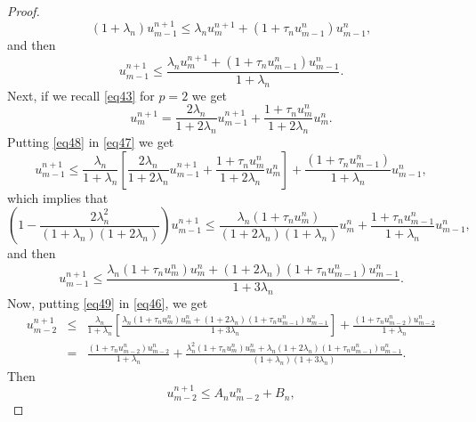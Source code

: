 \documentclass[a4paper,12pt,english,reqno]{smfart}
\begin{document}
\begin{proof}
\begin{equation*}
		(1+\lambda_{n})u_{m-1}^{n+1}\leq \lambda_{n}u_{m}^{n+1}+\left(1+\tau_{n}u_{m-1}^{n}\right)u_{m-1}^{n},
		\end{equation*}
		and then 
		\begin{equation}
		u_{m-1}^{n+1}\leq \frac{\lambda_{n}u_{m}^{n+1}+\left(1+\tau_{n}u_{m-1}^{n}\right)u_{m-1}^{n}}{1+\lambda_{n}}.
		\label{eq47}
		\end{equation}
		Next, if we recall \eqref{eq43} for $p=2$ we get
		\begin{equation}
		u_{m}^{n+1}=\frac{2\lambda_{n}}{1+2\lambda_{n}}u_{m-1}^{n+1}+\frac{1+\tau_{n}u_{m}^{n}}{1+2\lambda_{n}}u_{m}^{n}.
		\label{eq48}
		\end{equation}
		Putting \eqref{eq48} in \eqref{eq47} we get
		\begin{equation*}
		u_{m-1}^{n+1}\leq \frac{\lambda_{n}}{1+\lambda_{n}}\left[\frac{2\lambda_{n}}{1+2\lambda_{n}}u_{m-1}^{n+1}+\frac{1+\tau_{n}u_{m}^{n}}{1+2\lambda_{n}}u_{m}^{n}\right]+\frac{\left(1+\tau_{n}u_{m-1}^{n}\right)}{1+\lambda_{n}}u_{m-1}^{n},
		\end{equation*}
		which implies that
		\begin{equation*}
		\left(1-\frac{2\lambda_{n}^{2}}{(1+\lambda_{n})(1+2\lambda_{n})}\right)u_{m-1}^{n+1}\leq \frac{\lambda_{n}(1+\tau_{n}u_{m}^{n})}{(1+2\lambda_{n})(1+\lambda_{n})}u_{m}^{n}+\frac{1+\tau_{n}u_{m-1}^{n}}{1+\lambda_{n}}u_{m-1}^{n},
		\end{equation*}
		and then
		\begin{equation} 
		u_{m-1}^{n+1}\leq \frac{\lambda_{n}(1+\tau_{n}u_{m}^{n})u_{m}^{n}+(1+2\lambda_{n})(1+\tau_{n}u_{m-1}^{n})u_{m-1}^{n}}{1+3\lambda_{n}}.
		\label{eq49}
		\end{equation}
		Now, putting \eqref{eq49} in \eqref{eq46}, we get
		\begin{eqnarray*} 
			u_{m-2}^{n+1}&\leq& \frac{\lambda_{n}}{1+\lambda_{n}}\left[\frac{\lambda_{n}(1+\tau_{n}u_{m}^{n})u_{m}^{n}+(1+2\lambda_{n})(1+\tau_{n}u_{m-1}^{n})u_{m-1}^{n}}{1+3\lambda_{n}}\right]+\frac{\left(1+\tau_{n}u_{m-2}^{n}\right)u_{m-2}^{n}}{1+\lambda_{n}}\\ &=&\frac{\left(1+\tau_{n}u_{m-2}^{n}\right)u_{m-2}^{n}}{1+\lambda_{n}}+\frac{\lambda_{n}^{2}(1+\tau_{n}u_{m}^{n})u_{m}^{n}+\lambda_{n}(1+2\lambda_{n})(1+\tau_{n}u_{m-1}^{n})u_{m-1}^{n}}{(1+\lambda_{n})(1+3\lambda_{n})}.
		\end{eqnarray*}
		Then
		\begin{equation}
		u_{m-2}^{n+1}\leq A_{n}u_{m-2}^{n}+B_{n},
		\label{au}
		\end{equation}

\end{proof}
\end{document}
